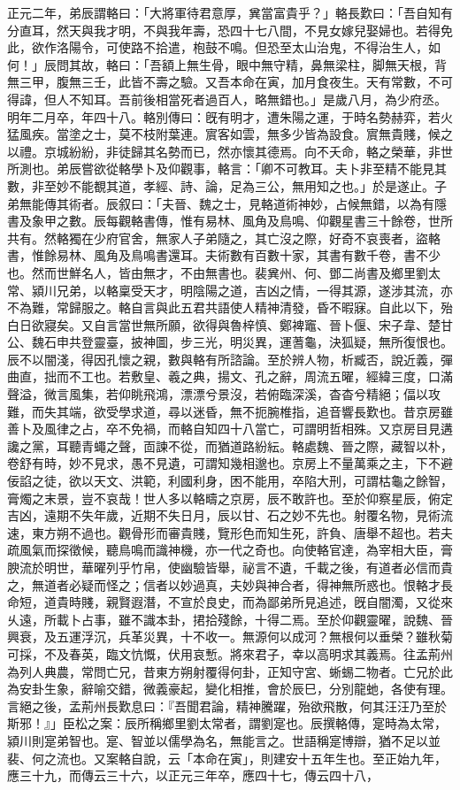 \begin{pinyinscope}
正元二年，弟辰謂輅曰：「大將軍待君意厚，兾當富貴乎？」輅長歎曰：「吾自知有分直耳，然天與我才明，不與我年壽，恐四十七八間，不見女嫁兒娶婦也。若得免此，欲作洛陽令，可使路不拾遣，枹鼓不鳴。但恐至太山治鬼，不得治生人，如何！」辰問其故，輅曰：「吾額上無生骨，眼中無守精，鼻無梁柱，脚無天根，背無三甲，腹無三壬，此皆不壽之驗。又吾本命在寅，加月食夜生。天有常數，不可得諱，但人不知耳。吾前後相當死者過百人，略無錯也。」是歲八月，為少府丞。明年二月卒，年四十八。輅別傳曰：旣有明才，遭朱陽之運，于時名勢赫弈，若火猛風疾。當塗之士，莫不枝附葉連。賔客如雲，無多少皆為設食。賔無貴賤，候之以禮。京城紛紛，非徒歸其名勢而已，然亦懷其德焉。向不夭命，輅之榮華，非世所測也。弟辰嘗欲從輅學卜及仰觀事，輅言：「卿不可教耳。夫卜非至精不能見其數，非至妙不能覩其道，孝經、詩、論，足為三公，無用知之也。」於是遂止。子弟無能傳其術者。辰叙曰：「夫晉、魏之士，見輅道術神妙，占候無錯，以為有隱書及象甲之數。辰每觀輅書傳，惟有易林、風角及鳥鳴、仰觀星書三十餘卷，世所共有。然輅獨在少府官舍，無家人子弟隨之，其亡沒之際，好奇不哀喪者，盜輅書，惟餘易林、風角及鳥鳴書還耳。夫術數有百數十家，其書有數千卷，書不少也。然而世鮮名人，皆由無才，不由無書也。裴兾州、何、鄧二尚書及鄉里劉太常、潁川兄弟，以輅稟受天才，明陰陽之道，吉凶之情，一得其源，遂涉其流，亦不為難，常歸服之。輅自言與此五君共語使人精神清發，昏不暇寐。自此以下，殆白日欲寢矣。又自言當世無所願，欲得與魯梓慎、鄭裨竈、晉卜偃、宋子韋、楚甘公、魏石申共登靈臺，披神圖，步三光，明災異，運蓍龜，決狐疑，無所復恨也。辰不以闇淺，得因孔懷之親，數與輅有所諮論。至於辨人物，析臧否，說近義，彈曲直，拙而不工也。若敷皇、羲之典，揚文、孔之辭，周流五曜，經緯三度，口滿聲溢，微言風集，若仰眺飛鴻，漂漂兮景沒，若俯臨深溪，杳杳兮精絕；偪以攻難，而失其端，欲受學求道，尋以迷昏，無不扼腕椎指，追音響長歎也。昔京房雖善卜及風律之占，卒不免禍，而輅自知四十八當亡，可謂明哲相殊。又京房目見遘讒之黨，耳聽青蠅之聲，靣諫不從，而猶道路紛紜。輅處魏、晉之際，藏智以朴，卷舒有時，妙不見求，愚不見遺，可謂知幾相邈也。京房上不量萬乘之主，下不避佞諂之徒，欲以天文、洪範，利國利身，困不能用，卒陷大刑，可謂枯龜之餘智，膏燭之末景，豈不哀哉！世人多以輅疇之京房，辰不敢許也。至於仰察星辰，俯定吉凶，遠期不失年歲，近期不失日月，辰以甘、石之妙不先也。射覆名物，見術流速，東方朔不過也。觀骨形而審貴賤，覽形色而知生死，許負、唐舉不超也。若夫疏風氣而探徵候，聽鳥鳴而識神機，亦一代之奇也。向使輅官達，為宰相大臣，膏腴流於明世，華曜列乎竹帛，使幽驗皆舉，祕言不遺，千載之後，有道者必信而貴之，無道者必疑而怪之；信者以妙過真，夫妙與神合者，得神無所惑也。恨輅才長命短，道貴時賤，親賢遐潛，不宣於良史，而為鄙弟所見追述，旣自闇濁，又從來乆遠，所載卜占事，雖不識本卦，捃拾殘餘，十得二焉。至於仰觀靈曜，說魏、晉興衰，及五運浮沉，兵革災異，十不收一。無源何以成河？無根何以垂榮？雖秋菊可採，不及春英，臨文忼慨，伏用哀慙。將來君子，幸以高明求其義焉。往孟荊州為列人典農，常問亡兄，昔東方朔射覆得何卦，正知守宮、蜥蜴二物者。亡兄於此為安卦生象，辭喻交錯，微義豪起，變化相推，會於辰巳，分別龍虵，各使有理。言絕之後，孟荊州長歎息曰：『吾聞君論，精神騰躍，殆欲飛散，何其汪汪乃至於斯邪！』」臣松之案：辰所稱鄉里劉太常者，謂劉寔也。辰撰輅傳，寔時為太常，潁川則寔弟智也。寔、智並以儒學為名，無能言之。世語稱寔博辯，猶不足以並裴、何之流也。又案輅自說，云「本命在寅」，則建安十五年生也。至正始九年，應三十九，而傳云三十六，以正元三年卒，應四十七，傳云四十八，
\end{pinyinscope}
